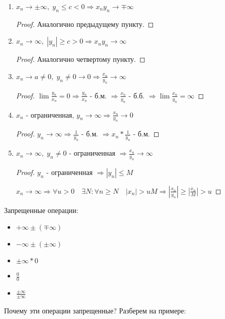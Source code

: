 \begin{enumerate}
\begin{proof}
            Случай $x_n \to -\infty$ рассматривается аналогично.
        \end{proof}
        \item $x_n \to \pm \infty,\; y_n \leqslant c < 0 \Rightarrow x_ny_n \to \mp \infty$
        \begin{proof}
            Аналогично предыдущему пункту.
        \end{proof}
        \item $x_n \to \infty,\; |y_n| \geqslant c > 0 \Rightarrow x_ny_n \to \infty $
        \begin{proof}
            Аналогично четвертому пункту.
        \end{proof}
        \item $x_n \to a \neq 0,\; y_n \neq 0 \to 0 \Rightarrow \frac{x_n}{y_n} \to \infty$
        \begin{proof}
            $\lim \frac{y_n}{x_n} = 0 \Rightarrow \frac{y_n}{x_n}$ - б.м. $\Rightarrow \frac{x_n}{y_n}$ - б.б. $\Rightarrow \lim \frac{x_n}{y_n} = \infty$ 
        \end{proof}
        \item $x_n$ - ограниченная, $y_n \to \infty \Rightarrow \frac{x_n}{y_n} \to 0$
        \begin{proof}
            $y_n \to \infty \Rightarrow \frac{1}{y_n}$ - б.м. $\Rightarrow x_n * \frac{1}{y_n}$ - б.м.
        \end{proof}
        \item $x_n \to \infty,\; y_n \neq 0$ - ограниченная $\Rightarrow \frac{x_n}{y_n} \to \infty$
        \begin{proof}
            $y_n$ - ограниченная $\Rightarrow |y_n| \leqslant M$
            
            $x_n \to \infty \Rightarrow \forall u > 0 \quad \exists N : \forall n \geqslant N \quad |x_n| > uM \Rightarrow |\frac{x_n}{y_n}| \geqslant |\frac{x_n}{M}| > u$
        \end{proof}
    \end{enumerate}
    \vspace{0.7cm}
    Запрещенные операции:
    \begin{itemize}
        \item $+\infty \pm (\mp\infty)$
        \item $-\infty \pm (\pm\infty)$
        \item $\pm \infty * 0$
        \item $\frac{0}{0}$
        \item $\frac{\pm \infty}{\pm \infty}$
    \end{itemize}
    \vspace{0.3cm}
    Почему эти операции запрещенные? Разберем на примере:
    
